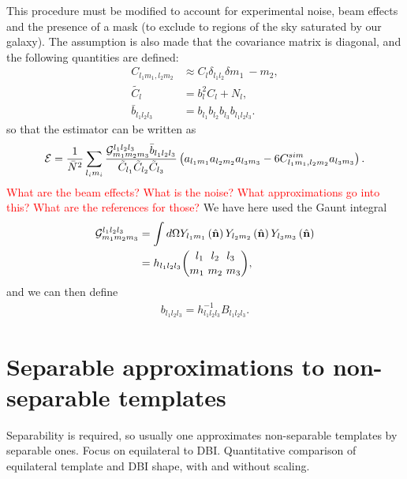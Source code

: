    This procedure must be modified to account for experimental noise, beam effects and
    the presence of a mask (to exclude to regions of the sky saturated by our galaxy).
    The assumption is also made that the covariance matrix is diagonal, and the
    following quantities are defined:
    \begin{align}
        C_{l_1m_1,l_2m_2}&\approx C_l\delta_{l_1l_2}\delta{m_1~-m_2},\\
           \tilde{C_l} &= b_l^2C_l+N_l,\\
           \bar{b}_{l_1l_2l_3} &= b_{l_1}b_{l_2}b_{l_3}b_{l_1l_2l_3}.
    \end{align}
    so that the estimator can be written as
    \begin{align}
        \mathcal{E} = \frac{1}{\bar{N}^2}\sum_{l_im_i}
        \frac{\mathcal{G}^{l_1l_2l_3}_{m_1m_2m_3}\bar{b}_{l_1l_2l_3}}{\tilde{C}_{l_1}\tilde{C}_{l_2}\tilde{C}_{l_3}}
        \left(a_{l_1m_1}a_{l_2m_2}a_{l_3m_3}-6C^{sim}_{l_1m_1,l_2m_2}a_{l_3m_3}\right).
    \end{align}
    \textcolor{red}{What are the beam effects? What is the noise? What approximations go into this?
    What are the references for those?}
    We have here used the Gaunt integral
    \begin{align}
        \mathcal{G}^{l_1l_2l_3}_{m_1m_2m_3} &= \int d\Omega Y_{l_1m_1}\left(\hat{\mathbf{n}}\right) Y_{l_2m_2}\left(\hat{\mathbf{n}}\right) Y_{l_3m_3}\left(\hat{\mathbf{n}}\right) \\
        &= h_{l_1l_2l_3}{{l_1~~l_2~~l_3} \choose {m_1~m_2~m_3}},
    \end{align}
    and we can then define
    \begin{align}
        b_{l_1l_2l_3} = h^{-1}_{l_1l_2l_3}B_{l_1l_2l_3}.
    \end{align}


    \section{Separable approximations to non-separable templates}
    Separability is required, so usually one approximates non-separable templates
    by separable ones.
    Focus on equilateral to DBI.
    Quantitative comparison of equilateral template and DBI shape,
    with and without scaling.

